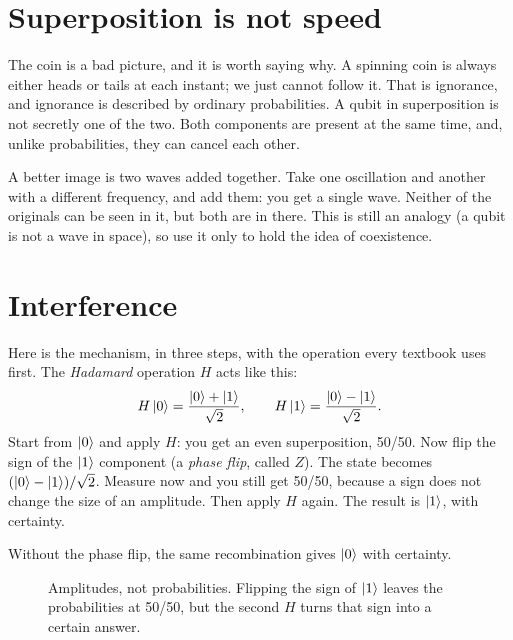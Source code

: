 \section{Superposition is not speed}

The coin is a bad picture, and it is worth saying why. A spinning coin is always
either heads or tails at each instant; we just cannot follow it. That is
ignorance, and ignorance is described by ordinary probabilities. A qubit in
superposition is not secretly one of the two. Both components are present at the
same time, and, unlike probabilities, they can cancel each other.

A better image is two waves added together. Take one oscillation and another with
a different frequency, and add them: you get a single wave. Neither of the
originals can be seen in it, but both are in there. This is still an analogy (a
qubit is not a wave in space), so use it only to hold the idea of coexistence.

\section{Interference}

Here is the mechanism, in three steps, with the operation every textbook uses
first. The \emph{Hadamard} operation $H$ acts like this:
\[
  H\ket{0} = \frac{\ket{0} + \ket{1}}{\sqrt{2}}, \qquad
  H\ket{1} = \frac{\ket{0} - \ket{1}}{\sqrt{2}}.
\]
Start from $\ket{0}$ and apply $H$: you get an even superposition, 50/50. Now
flip the sign of the $\ket{1}$ component (a \emph{phase flip}, called $Z$). The
state becomes $(\ket{0} - \ket{1})/\sqrt{2}$. Measure now and you still get 50/50,
because a sign does not change the size of an amplitude. Then apply $H$ again. The
result is $\ket{1}$, with certainty.

Without the phase flip, the same recombination gives $\ket{0}$ with certainty.

\begin{figure}[htbp]
\centering
{}
\caption{Amplitudes, not probabilities. Flipping the sign of $\ket{1}$ leaves the
probabilities at 50/50, but the second $H$ turns that sign into a certain answer.}
\end{figure}

